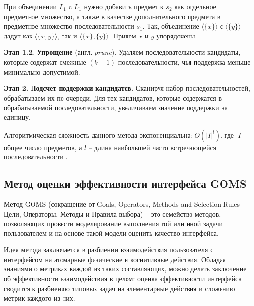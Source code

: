 При объединении $L_1$ c $L_1$ нужно добавить предмет к $s_2$ как отдельное предметное множество, а также в качестве дополнительного предмета в предметное множество последовательности $s_1$. Так, объединение $\langle\{x\}\rangle$ с $\langle\{y\}\rangle$ дадут как $\langle\{x, y\}\rangle$, так и $\langle\{x\},\{y\}\rangle$. Причем $x$ и $y$ упорядочены.

\textbf{Этап 1.2. Упрощение} (англ. \textit{prune}). Удаляем последовательности кандидаты, которые содержат смежные $(k-1)$-последовательности, чья поддержка меньше минимально допустимой.

\textbf{Этап 2. Подсчет поддержки кандидатов.} Сканируя набор последовательностей, обрабатываем их по очереди. Для тех кандидатов, которые содержатся в обрабатываемой последовательности, увеличиваем значение поддержки на единицу.	


Алгоритмическая сложность данного метода экспоненциальна: $O(|I|^l)$, где $|I|$ -- общее число предметов, а $l$ -- длина наибольшей часто встречающейся последовательности \cite{Data_mining_book}.

\subsection{Метод оценки эффективности интерфейса GOMS}
Метод GOMS (сокращение от Goals, Operators, Methods and Selection Rules -- Цели, Операторы, Методы и Правила выбора) -- это семейство методов, позволяющих провести моделирование выполнения той или иной задачи пользователем и на основе такой модели оценить качество интерфейса.

Идея метода заключается в разбиении взаимодействия пользователя с интерфейсом на атомарные физические и когнитивные действия. Обладая знаниями о метриках каждой из таких составляющих, можно делать заключение об эффективности взаимодействия в целом: оценка
эффективности интерфейса сводится к разбиению типовых задач на элементарные действия и сложению метрик каждого из них.

